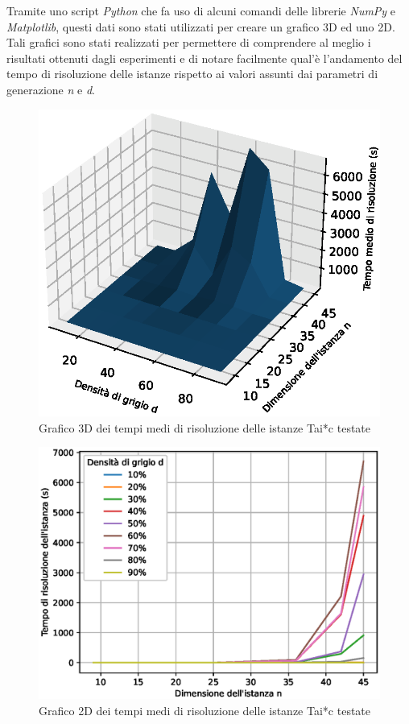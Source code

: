 \newpage \noindent
Tramite uno script \textit{Python} che fa uso di alcuni comandi delle librerie \textit{NumPy} e \textit{Matplotlib}, questi dati 
sono stati utilizzati per creare un grafico 3D ed uno 2D. Tali grafici sono stati realizzati per permettere di comprendere al meglio i risultati 
ottenuti dagli esperimenti e di notare facilmente qual'è l'andamento del tempo di risoluzione delle istanze rispetto ai valori assunti dai 
parametri di generazione \textit{n} e \textit{d}.
\begin{figure}[h!]
    \centering
    \includegraphics[scale=0.9]{images/resolution_times.eps}
    \caption{Grafico 3D dei tempi medi di risoluzione delle istanze Tai*c testate}
    \label{fig:times}
\end{figure}
\begin{figure}[h!]
    \centering
    \includegraphics[scale=0.59]{images/resolution_times2.eps}
    \caption{Grafico 2D dei tempi medi di risoluzione delle istanze Tai*c testate}
    \label{fig:times2}
\end{figure}


